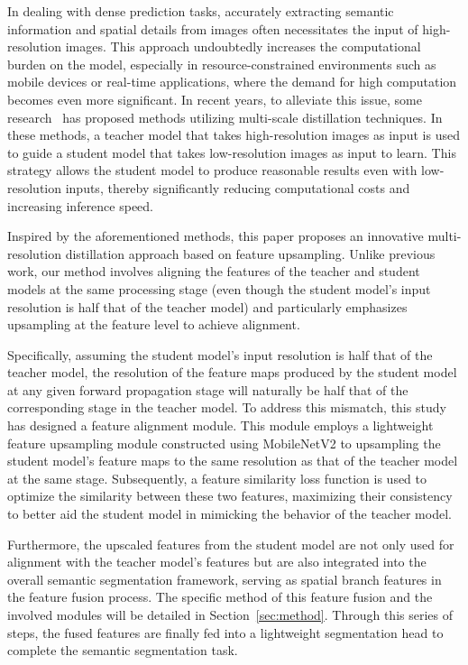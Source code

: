 In dealing with dense prediction tasks, accurately extracting semantic information and spatial details from images often necessitates the input of high-resolution images. This approach undoubtedly increases the computational burden on the model, especially in resource-constrained environments such as mobile devices or real-time applications, where the demand for high computation becomes even more significant. In recent years, to alleviate this issue, some research~\cite{qi2021multi, hu2022cross} has proposed methods utilizing multi-scale distillation techniques. In these methods, a teacher model that takes high-resolution images as input is used to guide a student model that takes low-resolution images as input to learn. This strategy allows the student model to produce reasonable results even with low-resolution inputs, thereby significantly reducing computational costs and increasing inference speed.

Inspired by the aforementioned methods, this paper proposes an innovative multi-resolution distillation approach based on feature upsampling. Unlike previous work, our method involves aligning the features of the teacher and student models at the same processing stage (even though the student model's input resolution is half that of the teacher model) and particularly emphasizes upsampling at the feature level to achieve alignment.

Specifically, assuming the student model's input resolution is half that of the teacher model, the resolution of the feature maps produced by the student model at any given forward propagation stage will naturally be half that of the corresponding stage in the teacher model. To address this mismatch, this study has designed a feature alignment module. This module employs a lightweight feature upsampling module constructed using MobileNetV2 to upsampling the student model's feature maps to the same resolution as that of the teacher model at the same stage. Subsequently, a feature similarity loss function is used to optimize the similarity between these two features, maximizing their consistency to better aid the student model in mimicking the behavior of the teacher model.

Furthermore, the upscaled features from the student model are not only used for alignment with the teacher model's features but are also integrated into the overall semantic segmentation framework, serving as spatial branch features in the feature fusion process. The specific method of this feature fusion and the involved modules will be detailed in Section~\ref{sec:method}. Through this series of steps, the fused features are finally fed into a lightweight segmentation head to complete the semantic segmentation task.

